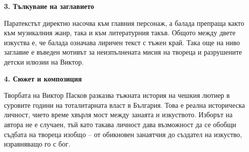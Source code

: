 \documentclass[12pt,a4paper]{article}
\begin{document}
\vspace{0.1cm}
\textbf{3. Тълкуване на заглавието}
\vspace{0.1cm}

\indent Паратекстът директно насочва към главния персонаж, а балада препраща както към музикалния жанр, така и към литературния такъв. Общото между двете изкуства е, че балада означава лиричен текст с тъжен край. Така още на ниво заглавие е въведен мотивът за неизпълнената мисия на твореца и разрушените детски илюзии на Виктор.

\vspace{0.1cm}
\textbf{4. Сюжет и композиция}
\vspace{0.1cm}

\indent Творбата на Виктор Пасков разказва тъжната история на чешкия лютиер в суровите години на тоталитарната власт в България. Това е реална историческа личност, чието време хвърля мост между занаята и изкуството. Изборът на автора не е случаен, тъй като такава личност дава възможност да се обобщи съдбата на твореца изобщо – от обикновен занаятчия до създател на изкуство, изравняващо го с бог.
\end{document}
